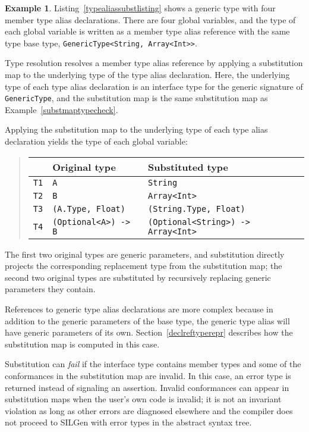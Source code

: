 \documentclass[a4paper,headsepline,bibliography=totoc,toc=flat,fleqn,twoside=semi]{scrbook}
\theoremstyle{definition}
\theoremstyle{definition}
\newtheorem{example}{Example}[chapter]
\theoremstyle{definition}
\begin{document}
\begin{example} Listing~\ref{typealiassubstlisting} shows a generic type with four member type alias declarations. There are four global variables, and the type of each global variable is written as a member type alias reference with the same type base type, \texttt{GenericType<String, Array<Int>>}. 

Type resolution resolves a member type alias reference by applying a substitution map to the underlying type of the type alias declaration. Here, the underlying type of each type alias declaration is an interface type for the generic signature of \texttt{GenericType}, and the substitution map is the same substitution map as Example~\ref{substmaptypecheck}.

Applying the substitution map to the underlying type of each type alias declaration yields the type of each global variable:
\begin{quote}
\begin{tabular}{|l|l|l|}
\hline
&\textbf{Original type}&\textbf{Substituted type}\\
\hline
\texttt{T1}&\texttt{A}&\texttt{String}\\
\texttt{T2}&\texttt{B}&\texttt{Array<Int>}\\
\texttt{T3}&\texttt{(A.Type, Float)}&\texttt{(String.Type, Float)}\\
\texttt{T4}&\texttt{(Optional<A>) -> B}&\texttt{(Optional<String>) -> Array<Int>}\\
\hline
\end{tabular}
\end{quote}
The first two original types are generic parameters, and substitution directly projects the corresponding replacement type from the substitution map; the second two original types are substituted by recursively replacing generic parameters they contain.

References to generic type alias declarations are more complex because in addition to the generic parameters of the base type, the generic type alias will have generic parameters of its own. Section~\ref{declreftyperepr} describes how the substitution map is computed in this case.
\end{example}

Substitution can \emph{fail} if the interface type contains member types and some of the conformances in the substitution map are invalid. In this case, an error type is returned instead of signaling an assertion. Invalid conformances can appear in substitution maps when the user's own code is invalid; it is not an invariant violation as long as other errors are diagnosed elsewhere and the compiler does not proceed to SILGen with error types in the abstract syntax tree.
\end{document}
